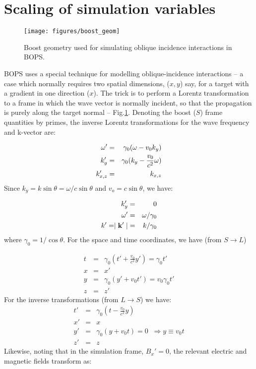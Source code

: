 \documentclass[11pt]{article}
\def\bea{\begin{eqnarray}}
\def\eea{\end{eqnarray}}
\begin{document}
\section{Scaling of simulation variables}
\label{scaling}
\begin{figure}[ht]
\begin{center}
\texttt{[image: figures/boost\_geom]}
\caption{Boost geometry used for simulating oblique incidence interactions in BOPS.}
\end{center}
\label{boost}
\end{figure}
BOPS uses a special technique for modelling oblique-incidence interactions -- a case which normally requires two spatial dimensions, ($x,y$) say, for a target with a gradient in one direction ($x$).  The trick is to perform a Lorentz transformation to a frame in which the wave vector is normally incident, so that the propagation is purely along the target normal --   Fig.\ref{boost}.  Denoting the boost ($S$) frame quantities by primes, the inverse Lorentz transformations for the wave 
frequency and k-vector are:

\bea
\omega' & = & \gamma_0(\omega - v_0k_y) \nonumber \\
\vspace{0.5cm}
k_y' & = & \gamma_0(k_y - \frac{v_0}{c^2}\omega)  \\
k_{x,z}' & = & k_{x,z} \nonumber 
\eea
%
Since $k_y = k\sin\theta = \omega/c\sin\theta$ and $v_o = c\sin\theta$, we
have:

\bea
k_y' & = & 0 \nonumber \\
\omega' & = & \omega/\gamma_0 \label{freq} \\
k' = \mid {\bf k}'\mid & = & k/\gamma_0 \nonumber
\eea
where $\gamma_0 = 1/\cos\theta$.  For the space and time coordinates, we have (from $S\rightarrow L$)

\bea
t & = & \gamma_0(t' + \frac{v_0}{c^2}y') = \gamma_0t' \nonumber \\
x & = & x'   \\
y & = & \gamma_0(y' + v_0 t') = v_0\gamma_0 t'\nonumber\\
z & = & z' \nonumber \label{time}
\eea
%
For the inverse transformations (from $L\rightarrow S$) we have:
\bea
t' & = & \gamma_0(t - \frac{v_0}{c^2}y) \nonumber \\
x' & = & x   \label{time_inv} \\
y' & = & \gamma_0(y + v_0 t) =0 \;\; \Rightarrow y\equiv v_0 t \nonumber\\
z' & = & z \nonumber 
\eea
Likewise, noting that in the simulation frame, $B_x'=0$, the relevant electric and magnetic fields transform as:
\end{document}
